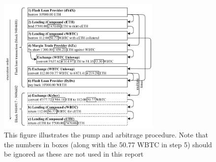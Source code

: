 \begin{figure}
  \centering
  \includegraphics[width=8cm]{assests/pump-and-arb}
  \caption{This figure illustrates the pump and arbitrage
    procedure. Note that the numbers in boxes (along with the 50.77
    WBTC in step 5) should be ignored as these are not used in this
    report \cite[p. 5 fig. 6]{attack}}
  \label{fig:pumpAndArb}
\end{figure}
